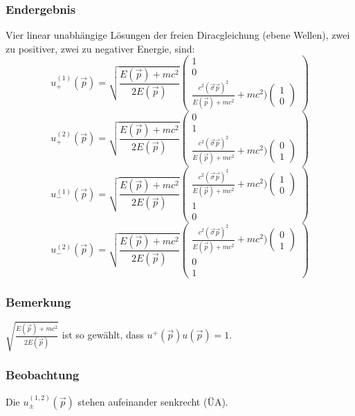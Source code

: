 \documentclass[twoside,a4paper]{scrartcl}
\renewcommand{\1}{\mathds{1}}
\begin{document}
\subsubsection*{Endergebnis}
Vier linear unabhängige Lösungen der freien Diracgleichung (ebene Wellen), zwei zu positiver, zwei zu negativer Energie, sind:
$$u_+^{(1)}(\vec p)=\sqrt{\frac{E(\vec p)+mc^2}{2 E(\vec p)}} \begin{pmatrix}1 \\ 0 \\ \frac{c^2(\vec\sigma\vec p)^2}{E(\vec p)+mc^2}+mc^2) \begin{pmatrix}1 \\ 0\end{pmatrix} \end{pmatrix}$$
$$u_+^{(2)}(\vec p)=\sqrt{\frac{E(\vec p)+mc^2}{2 E(\vec p)}} \begin{pmatrix}0 \\ 1 \\ \frac{c^2(\vec\sigma\vec p)^2}{E(\vec p)+mc^2}+mc^2) \begin{pmatrix}0 \\ 1\end{pmatrix} \end{pmatrix}$$
$$u_-^{(1)}(\vec p)=\sqrt{\frac{E(\vec p)+mc^2}{2 E(\vec p)}} \begin{pmatrix}\frac{c^2(\vec\sigma\vec p)^2}{E(\vec p)+mc^2}+mc^2) \begin{pmatrix}1 \\ 0\end{pmatrix} \\ 1 \\ 0 \end{pmatrix}$$
$$u_-^{(2)}(\vec p)=\sqrt{\frac{E(\vec p)+mc^2}{2 E(\vec p)}} \begin{pmatrix}\frac{c^2(\vec\sigma\vec p)^2}{E(\vec p)+mc^2}+mc^2) \begin{pmatrix}0 \\ 1\end{pmatrix} \\ 0 \\ 1 \end{pmatrix}$$
\subsubsection*{Bemerkung}
$\sqrt{\frac{E(\vec p)+mc^2}{2 E(\vec p)}}$ ist so gewählt, dass $u^+(\vec p)u(\vec p)=1$.
\subsubsection*{Beobachtung}
Die $u_{\pm}^{(1,2)}(\vec p)$ stehen aufeinander senkrecht (ÜA).
% 
\end{document}
